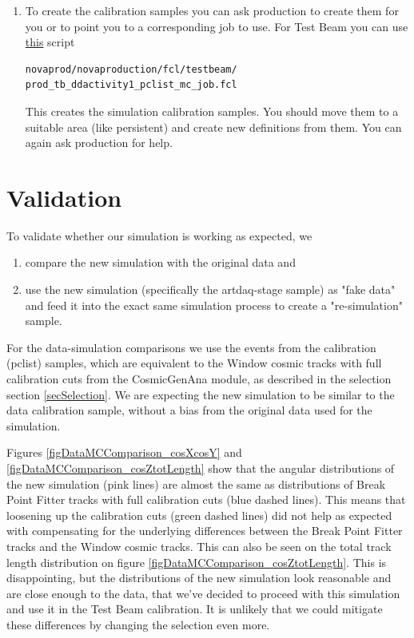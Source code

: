 \documentclass[12pt]{article}
\begin{document}
\begin{enumerate}
\item To create the calibration samples you can ask production to create them for you or to point you to a corresponding job to use. For Test Beam you can use \href{https://github.com/novaexperiment/novaprod/blob/main/novaproduction/fcl/testbeam/prod\_tb\_ddactivity1\_pclist\_mc\_job.fcl}{this} script
\begin{lstlisting}[frame=single,language=bash]
novaprod/novaproduction/fcl/testbeam/
prod_tb_ddactivity1_pclist_mc_job.fcl
\end{lstlisting}
This creates the simulation calibration samples. You should move them to a suitable area (like persistent) and create new definitions from them. You can again ask production for help.
\end{enumerate}

\section{Validation}
To validate whether our simulation is working as expected, we
\begin{enumerate}
\item compare the new simulation with the original data and
\item use the new simulation (specifically the artdaq-stage sample) as "fake data" and feed it into the exact same simulation process to create a "re-simulation" sample.
\end{enumerate}

For the data-simulation comparisons we use the events from the calibration (pclist) samples, which are equivalent to the Window cosmic tracks with full calibration cuts from the CosmicGenAna module, as described in the selection section \ref{secSelection}. We are expecting the new simulation to be similar to the data calibration sample, without a bias from the original data used for the simulation.

Figures \ref{figDataMCComparison_cosXcosY} and \ref{figDataMCComparison_cosZtotLength} show that the angular distributions of the new simulation (pink lines) are almost the same as distributions of Break Point Fitter tracks with full calibration cuts (blue dashed lines). This means that loosening up the calibration cuts (green dashed lines) did not help as expected with compensating for the underlying differences between the Break Point Fitter tracks and the Window cosmic tracks. This can also be seen on the total track length distribution on figure \ref{figDataMCComparison_cosZtotLength}. This is disappointing, but the distributions of the new simulation look reasonable and are close enough to the data, that we've decided to proceed with this simulation and use it in the Test Beam calibration. It is unlikely that we could mitigate these differences by changing the selection even more.
\end{document}
